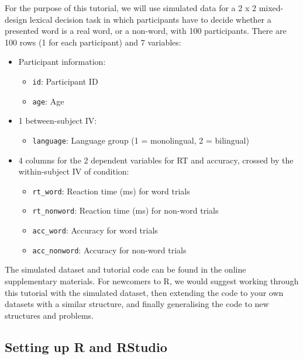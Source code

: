 \documentclass[
  english,
  doc,floatsintext]{apa6}
\providecommand{\tightlist}{%
  \setlength{\itemsep}{0pt}\setlength{\parskip}{0pt}}
\begin{document}
For the purpose of this tutorial, we will use simulated data for a 2 x 2 mixed-design lexical decision task in which participants have to decide whether a presented word is a real word, or a non-word, with 100 participants. There are 100 rows (1 for each participant) and 7 variables:

\begin{itemize}
\item
  Participant information:

  \begin{itemize}
  \tightlist
  \item
    \texttt{id}: Participant ID
  \item
    \texttt{age}: Age
  \end{itemize}
\item
  1 between-subject IV:

  \begin{itemize}
  \tightlist
  \item
    \texttt{language}: Language group (1 = monolingual, 2 = bilingual)
  \end{itemize}
\item
  4 columns for the 2 dependent variables for RT and accuracy, crossed by the within-subject IV of condition:

  \begin{itemize}
  \tightlist
  \item
    \texttt{rt\_word}: Reaction time (ms) for word trials
  \item
    \texttt{rt\_nonword}: Reaction time (ms) for non-word trials
  \item
    \texttt{acc\_word}: Accuracy for word trials
  \item
    \texttt{acc\_nonword}: Accuracy for non-word trials
  \end{itemize}
\end{itemize}

The simulated dataset and tutorial code can be found in the online supplementary materials. For newcomers to R, we would suggest working through this tutorial with the simulated dataset, then extending the code to your own datasets with a similar structure, and finally generalising the code to new structures and problems.

\hypertarget{setting-up-r-and-rstudio}{%
\subsection{Setting up R and RStudio}\label{setting-up-r-and-rstudio}}
\end{document}
